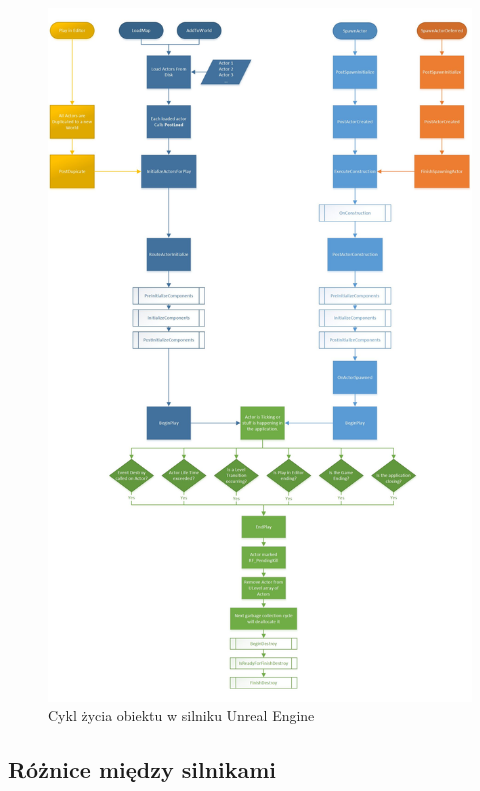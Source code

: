 \documentclass[12pt,twoside]{article}
\begin{document}
\begin{figure}[ht]
    \centering
    \includegraphics[width=14cm]{figures/ActorLifeCycle1UNREAL.jpg}
    \caption{Cykl życia obiektu w silniku Unreal Engine\cite{UE:ActorLifeCycleSource}}
    \label{UE:ActorLifeCycle}
\end{figure}





\clearpage
\subsection{Różnice między silnikami}
\end{document}
